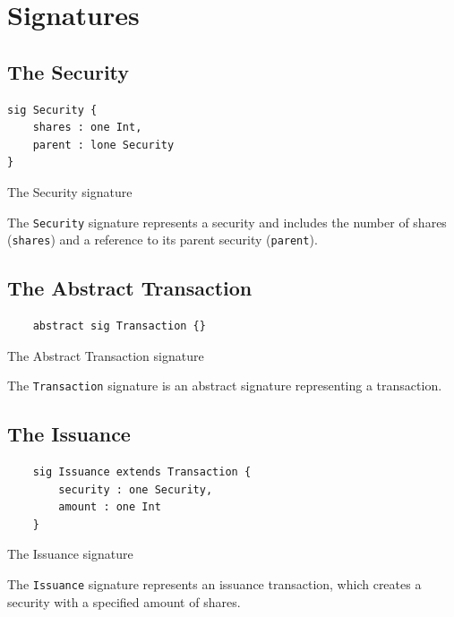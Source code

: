 \section{Signatures}

\subsection{The Security}

\begin{listing}[!h]
\begin{verbatim}
sig Security {
    shares : one Int,
    parent : lone Security
}
\end{verbatim}
\caption{The Security signature}
\label{lst:security-sig-1}
\end{listing}


The \texttt{Security} signature represents a security and includes the number of shares (\texttt{shares}) and a reference to its parent security (\texttt{parent}).

\subsection{The Abstract Transaction}

\begin{listing}[!h]
\begin{verbatim}
	abstract sig Transaction {}
\end{verbatim}
\caption{The Abstract Transaction signature}
\label{lst:transaction-sig-1}
\end{listing}

The \texttt{Transaction} signature is an abstract signature representing a transaction.

\subsection{The Issuance}
\begin{listing}[!h]
\begin{verbatim}
	sig Issuance extends Transaction {
		security : one Security,
		amount : one Int
	}
\end{verbatim}
\caption{The Issuance signature}
\label{lst:issuance-sig-1}
\end{listing}

The \texttt{Issuance} signature represents an issuance transaction, which creates a security with a specified amount of shares.

